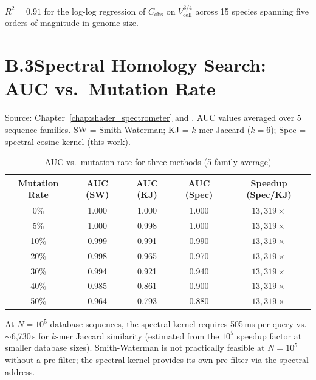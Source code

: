 \noindent
$R^2 = 0.91$ for the log-log regression of $C_{\mathrm{obs}}$ on $V_{\mathrm{cell}}^{3/4}$
across 15 species spanning five orders of magnitude in genome size.

\section*{B.3\quad Spectral Homology Search: AUC vs.\ Mutation Rate}
\label{app:shader_table}

\noindent
Source: Chapter~\ref{chap:shader_spectrometer} and \citet{Sachikonye2025_Shader}.
AUC values averaged over 5 sequence families. SW = Smith-Waterman; KJ = $k$-mer
Jaccard ($k=6$); Spec = spectral cosine kernel (this work).

\vspace{6pt}

\begin{table}[H]
\centering
\caption{AUC vs.\ mutation rate for three methods (5-family average)}
\label{tab:auc_mutation}
\begin{tabular}{ccccc}
\toprule
Mutation Rate & AUC (SW) & AUC (KJ) & AUC (Spec) & Speedup (Spec/KJ) \\
\midrule
0\%  & 1.000 & 1.000 & 1.000 & $13{,}319\times$ \\
5\%  & 1.000 & 0.998 & 1.000 & $13{,}319\times$ \\
10\% & 0.999 & 0.991 & 0.990 & $13{,}319\times$ \\
20\% & 0.998 & 0.965 & 0.970 & $13{,}319\times$ \\
30\% & 0.994 & 0.921 & 0.940 & $13{,}319\times$ \\
40\% & 0.985 & 0.861 & 0.900 & $13{,}319\times$ \\
50\% & 0.964 & 0.793 & 0.880 & $13{,}319\times$ \\
\bottomrule
\end{tabular}
\end{table}

\noindent
At $N = 10^5$ database sequences, the spectral kernel requires 505\,ms per query
vs.\ $\sim$6,730\,s for $k$-mer Jaccard similarity (estimated from the $10^5$ speedup
factor at smaller database sizes). Smith-Waterman is not practically feasible at
$N = 10^5$ without a pre-filter; the spectral kernel provides its own pre-filter
via the spectral address.

